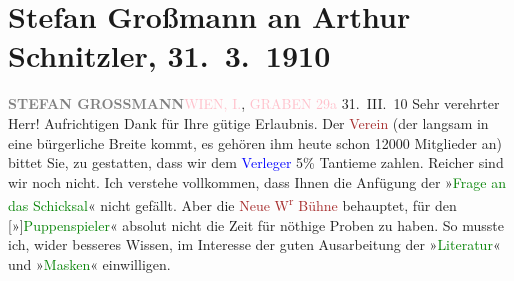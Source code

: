 

               \section[Stefan Großmann an Arthur Schnitzler, 31. 3. 1910]{ Stefan Großmann an Arthur Schnitzler, 31. 3. 1910}\nopagebreak{}\rehead{ }\normalsize\beginnumbering{} \toendnotes[C]{\smallbreak\pagebreak[2]} 
\toendnotes[C]{\smallbreak}\pstart
           \noindent{}{\pb}\textcolor{gray}{\textbf{STEFAN GROSSMANN}}\hfill \textcolor{pink}{WIEN, I.}{}\ledrightnote{\textcolor{pink}{I., Innere Stadt}}, \textcolor{pink}{GRABEN
                        29a}{}\ledrightnote{\textcolor{pink}{Graben}}\pend
           \pstart
           \centering{}31. III. 10\pend
           \pstart{}Sehr verehrter Herr!\pend\pstart
           Aufrichtigen Dank für Ihre gütige Erlaubnis. Der \textcolor{brown}{Verein}{} (der langsam in eine bürgerliche Breite kommt, es
               gehören ihm heute schon 12000 Mitglieder an) bittet Sie, zu gestatten, dass wir dem
                  \textcolor{blue}{Verleger}{} 5{\%} Tantieme zahlen. Reicher sind wir noch nicht.\pend
           \pstart
           Ich verstehe vollkommen, dass Ihnen die Anfügung der »\textcolor{green}{Frage an das Schicksal}{}\ledrightnote{\textcolor{green}{Die Frage an das Schicksal}}« nicht gefällt. Aber die \textcolor{brown}{Neue W\textsuperscript{r} Bühne}{}\ledrightnote{\textcolor{brown}{Neue Wiener Bühne}} behauptet, für den
                  {[}»{]}\textcolor{green}{Puppenspieler}{}\ledrightnote{\textcolor{green}{Der Puppenspieler}}« absolut nicht die Zeit für nöthige
               Proben zu haben. So musste ich, wider besseres Wissen, {\pb}im Interesse der guten Ausarbeitung der »\textcolor{green}{Literatur}{}\ledrightnote{\textcolor{green}{Literatur}}« und »\textcolor{green}{Masken}{}\ledrightnote{\textcolor{green}{Die letzten Masken}}« einwilligen.\pend
